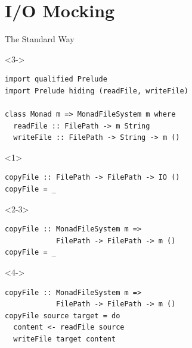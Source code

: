\documentclass[aspectratio=169]{beamer}
\begin{document}
\section{I/O Mocking}


\begin{frame}[fragile]{The Standard Way}
\begin{visibleenv}<3->
\begin{verbatim}
import qualified Prelude
import Prelude hiding (readFile, writeFile)

class Monad m => MonadFileSystem m where
  readFile :: FilePath -> m String
  writeFile :: FilePath -> String -> m ()
\end{verbatim}
\end{visibleenv}

\vspace{1.5em}

\begin{onlyenv}<1>
\begin{verbatim}
copyFile :: FilePath -> FilePath -> IO ()
copyFile = _
\end{verbatim}
\end{onlyenv}

\begin{onlyenv}<2-3>
\begin{verbatim}
copyFile :: MonadFileSystem m =>
            FilePath -> FilePath -> m ()
copyFile = _
\end{verbatim}
\end{onlyenv}

\begin{visibleenv}<4->
\begin{verbatim}
copyFile :: MonadFileSystem m =>
            FilePath -> FilePath -> m ()
copyFile source target = do
  content <- readFile source
  writeFile target content
\end{verbatim}
\end{visibleenv}
\end{frame}
\end{document}
